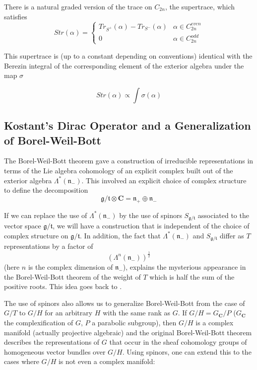 \documentclass[a4paper,a4paper]{article}
\theoremstyle{conjecture}
\begin{document}
There is a natural graded version of the trace on $C_{2n}$, the supertrace,
which satisfies
\begin{equation*}
Str(\alpha)=
\begin{cases}
Tr_{S^+}(\alpha)-Tr_{S^-}(\alpha)& \alpha \in C_{2n}^{even}\\
0&\alpha \in C_{2n}^{odd}
\end{cases}
\end{equation*}

This supertrace is (up to a constant depending on conventions) identical with the Berezin
integral of the corresponding element of the exterior algebra under the map $\sigma$

$$Str(\alpha)\propto \int \sigma(\alpha)$$


\subsection{Kostant's Dirac Operator and a Generalization of Borel-Weil-Bott}

The Borel-Weil-Bott theorem gave a construction of irreducible
representations in terms of the Lie algebra cohomology of an explicit complex
built out of the exterior algebra $\Lambda^*(\mathfrak n_-)$.  This
involved an explicit choice of complex structure to define the
decomposition
$$ {\mathfrak g}/{\mathfrak t}\otimes{\mathbf C}={\mathfrak n}_+
\oplus {\mathfrak n}_-$$

If we can replace the use of $\Lambda^*(\mathfrak n_-)$ by the use of
spinors $S_{{\mathfrak g}/{\mathfrak t}}$ associated to the vector
space ${\mathfrak g}/{\mathfrak t}$, we will have a construction
that is independent of the choice of complex structure on ${\mathfrak g}/{\mathfrak t}$.
In addition, the fact that $\Lambda^*(\mathfrak n_-)$ and  $S_{{\mathfrak g}/{\mathfrak t}}$
differ as $T$ representations by a factor of
$$(\Lambda^n(\mathfrak n_-))^\frac{1}{2}$$
(here $n$ is the complex dimension of $\mathfrak n_-$), explains the
mysterious appearance in the Borel-Weil-Bott theorem of the weight
of $T$ which is half the sum of the positive roots.  This idea goes back to \cite{Bott2}.

The use of spinors also allows us to generalize Borel-Weil-Bott from the
case of $G/T$ to $G/H$ for an arbitrary $H$ with the same rank as $G$.
If $G/H=G_{\mathbf C}/P$ ($G_{\mathbf C}$ the complexification of $G$,
$P$ a parabolic subgroup), then $G/H$ is a complex manifold (actually
projective algebraic) and the original Borel-Weil-Bott theorem \cite{Bott1}
describes the representations of $G$ that occur in the sheaf cohomology groups
of homogeneous vector bundles over $G/H$.  Using spinors, one can extend
this \cite{GKRS} to the cases where $G/H$ is not even a complex manifold:
\end{document}
